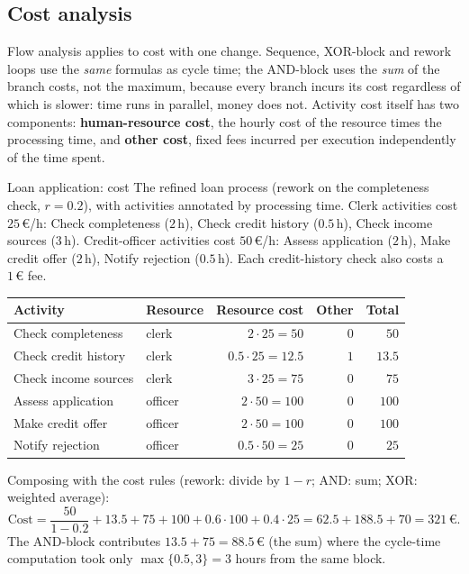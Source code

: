 \subsection{Cost analysis}

Flow analysis applies to cost with one change. Sequence, XOR-block and rework loops use the \emph{same} formulas as cycle time; the AND-block uses the \emph{sum} of the branch costs, not the maximum, because every branch incurs its cost regardless of which is slower: time runs in parallel, money does not. Activity cost itself has two components: \textbf{human-resource cost}, the hourly cost of the resource times the processing time, and \textbf{other cost}, fixed fees incurred per execution independently of the time spent.
\begin{examplebox}{Loan application: cost}
The refined loan process (rework on the completeness check, $r = 0.2$), with activities annotated by processing time. Clerk activities cost $25\,\euro$/h: Check completeness ($2$\,h), Check credit history ($0.5$\,h), Check income sources ($3$\,h). Credit-officer activities cost $50\,\euro$/h: Assess application ($2$\,h), Make credit offer ($2$\,h), Notify rejection ($0.5$\,h). Each credit-history check also costs a $1\,\euro$ fee.
\begin{center}
\begin{tabular}{llrrr}
\toprule
\textbf{Activity} & \textbf{Resource} & \textbf{Resource cost} & \textbf{Other} & \textbf{Total}\\
\midrule
Check completeness   & clerk   & $2 \cdot 25 = 50$     & $0$ & $50$\\
Check credit history & clerk   & $0.5 \cdot 25 = 12.5$ & $1$ & $13.5$\\
Check income sources & clerk   & $3 \cdot 25 = 75$     & $0$ & $75$\\
Assess application   & officer & $2 \cdot 50 = 100$    & $0$ & $100$\\
Make credit offer    & officer & $2 \cdot 50 = 100$    & $0$ & $100$\\
Notify rejection     & officer & $0.5 \cdot 50 = 25$   & $0$ & $25$\\
\bottomrule
\end{tabular}
\end{center}
Composing with the cost rules (rework: divide by $1 - r$; AND: sum; XOR: weighted average):
$$\text{Cost} = \frac{50}{1 - 0.2} + 13.5 + 75 + 100 + 0.6 \cdot 100 + 0.4 \cdot 25 = 62.5 + 188.5 + 70 = 321\,\euro.$$
The AND-block contributes $13.5 + 75 = 88.5\,\euro$ (the sum) where the cycle-time computation took only $\max\{0.5, 3\} = 3$ hours from the same block.
\end{examplebox}

